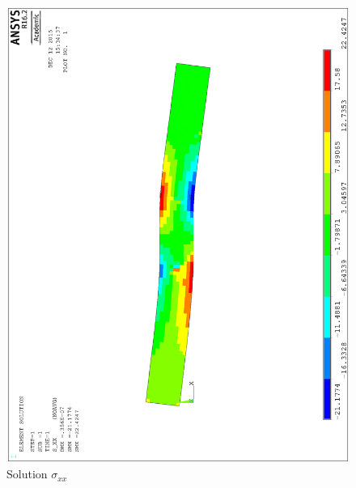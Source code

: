 \documentclass[letterpaper,12pt,]{article}
\begin{document}
\begin{landscape}
\newpage
\begin{figure}[h]
\centering
\includegraphics[width=1.0\textwidth,angle=-90]{tcasesolxx.eps}
\caption{Solution $\sigma_{xx}$}
\label{fig:resxx1}
\end{figure}


\end{landscape}
\end{document}
